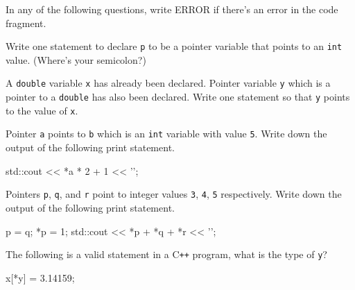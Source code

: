 

In any of the following questions, write ERROR if there's
an error in the code fragment.

\nextq
Write one statement to declare \verb!p! to be a pointer
variable that points to an \verb!int! value.
(Where's your semicolon?)
\\
\ANSWER
\begin{answercode}

\end{answercode}
\vspace{-6pt}

\nextq
A \verb!double! variable \verb$x$ has already been declared.
Pointer variable \verb!y! which is a pointer to a \verb!double!
has also been declared.
Write one statement so that \verb!y! points to the value of
\verb!x!.
\\
\ANSWER
\begin{answercode}

\end{answercode}

\nextq
Pointer \verb!a! points to \verb!b! which is an \verb!int!
variable with value \verb!5!.
Write down the output of the following print statement.
\begin{console}
std::cout << *a * 2 + 1 << '\n';
\end{console}
\ANSWER
\begin{answercode}

\end{answercode}

\nextq
Pointers \verb!p!, \verb!q!, and \verb!r! point
to integer values \verb!3!, \verb!4!, \verb!5!
respectively.
Write down the output of the following print statement.
\begin{console}
p = q;
*p = 1;
std::cout << *p + *q + *r << '\n';
\end{console}
\ANSWER
\begin{answercode}

\end{answercode}

\nextq
The following is a valid statement in a C\texttt{++} program,
what is the type of \verb!y!?
\begin{console}
x[*y] = 3.14159;
\end{console}
\ANSWER
\begin{answercode}

\end{answercode}

